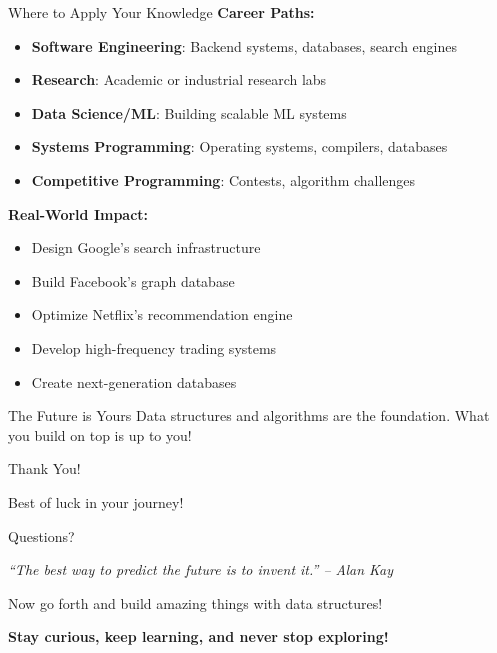 \documentclass[aspectratio=169,xcolor=dvipsnames]{beamer}
\begin{document}
\begin{frame}{Where to Apply Your Knowledge}
  \textbf{Career Paths:}
  \begin{itemize}
    \item \textbf{Software Engineering}: Backend systems, databases, search engines
    \item \textbf{Research}: Academic or industrial research labs
    \item \textbf{Data Science/ML}: Building scalable ML systems
    \item \textbf{Systems Programming}: Operating systems, compilers, databases
    \item \textbf{Competitive Programming}: Contests, algorithm challenges
  \end{itemize}

  \vspace{0.3cm}
  \textbf{Real-World Impact:}
  \begin{itemize}
    \item Design Google's search infrastructure
    \item Build Facebook's graph database
    \item Optimize Netflix's recommendation engine
    \item Develop high-frequency trading systems
    \item Create next-generation databases
  \end{itemize}

  \vspace{0.3cm}
  \begin{alertblock}{The Future is Yours}
    Data structures and algorithms are the foundation. What you build on top is up to you!
  \end{alertblock}
\end{frame}

\begin{frame}
  \begin{center}
    {\Huge Thank You!}

    \vspace{0.5cm}
    {\Large Best of luck in your journey!}

    \vspace{1cm}
    {\Large Questions?}

    \vspace{1cm}
    \textit{``The best way to predict the future is to invent it.'' -- Alan Kay}

    \vspace{0.5cm}
    \small Now go forth and build amazing things with data structures!

    \vspace{1cm}
    \textbf{Stay curious, keep learning, and never stop exploring!}
  \end{center}
\end{frame}
\end{document}
